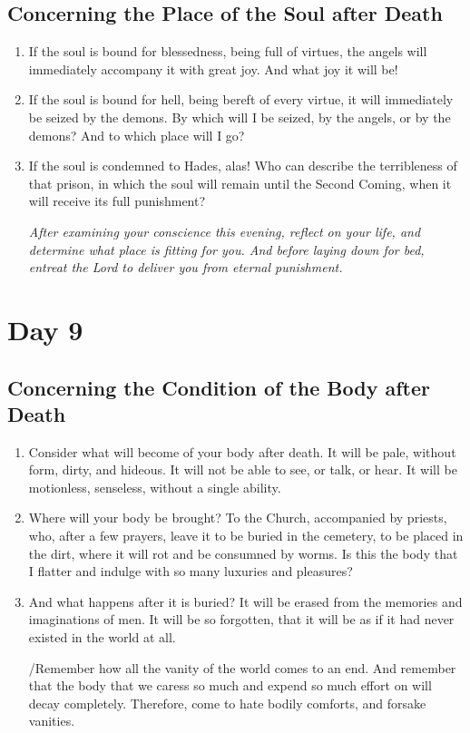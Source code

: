 \documentclass[11pt]{article}
\begin{document}
\subsection*{Concerning the Place of the Soul after Death}
\label{sec:org39035e9}
\begin{enumerate}
\item If the soul is bound for blessedness, being full of virtues, the angels will immediately accompany it with great joy. And what joy it will be!
\item If the soul is bound for hell, being bereft of every virtue, it will immediately be seized by the demons. By which will I be seized, by the angels, or by the demons?
And to which place will I go?
\item If the soul is condemned to Hades, alas! Who can describe the terribleness of that prison, in which the soul will remain until the Second Coming, when it will receive its full punishment?

\emph{After examining your conscience this evening, reflect on your life, and determine what place is fitting for you. And before laying down for bed, entreat the Lord to deliver you from eternal punishment.}
\end{enumerate}
\section*{Day 9}
\label{sec:org2a3f0d4}
\subsection*{Concerning the Condition of the Body after Death}
\label{sec:orgf60ca6b}
\begin{enumerate}
\item Consider what will become of your body after death. It will be pale, without form, dirty, and hideous. It will not be able to see, or talk, or hear. It will be motionless, senseless, without a single ability.
\item Where will your body be brought? To the Church, accompanied by priests, who, after a few prayers, leave it to be buried in the cemetery, to be placed in the dirt, where it will rot and be consumned by worms.
Is this the body that I flatter and indulge with so many luxuries and pleasures?
\item And what happens after it is buried? It will be erased from the memories and imaginations of men. It will be so forgotten, that it will be as if it had never existed in the world at all.

/Remember how all the vanity of the world comes to an end. And remember that the body that we caress so much and expend so much effort on will decay completely. Therefore, come to hate bodily comforts, and forsake vanities.
\end{enumerate}
\end{document}
